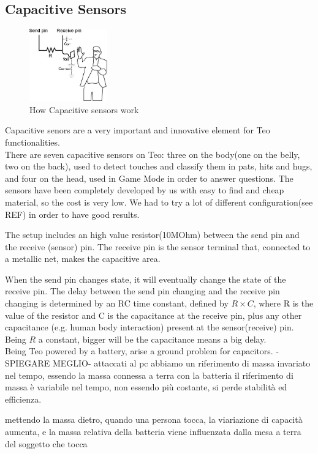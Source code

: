 \subsection{Capacitive Sensors}
\begin{figure}[h]
	\centering
	\includegraphics[width=0.3\textwidth]{CapSense}
	\caption{How Capacitive sensors work}
\end{figure}
Capacitive senors are a very important and innovative element for Teo functionalities.\\
There are seven capacitive sensors on Teo: three on the body(one on the belly, two on the back), used to detect touches and classify them in pats, hits and hugs, and four on the head, used in Game Mode in order to answer questions. 
The sensors have been completely developed by us with easy to find and cheap material, so the cost is very low. We had to try a lot of different configuration(see REF) in order to have good results. 

The setup includes an high value resistor(10MOhm) between the send pin and the receive (sensor) pin. The receive pin is the sensor terminal that, connected to a metallic net, makes the capacitive area.

When the send pin changes state, it will eventually change the state of the receive pin. The delay between the send pin changing and the receive pin changing is determined by an RC time constant, defined by $R \times C$, where R is the value of the resistor and C is the capacitance at the receive pin, plus any other capacitance (e.g. human body interaction) present at the sensor(receive) pin\cite{CapSenseLib}. Being $R$ a constant, bigger will be the capacitance means a big delay.\\

Being Teo powered by a battery, arise a ground problem for capacitors. 
-SPIEGARE MEGLIO-
attaccati al pc abbiamo un riferimento di massa invariato nel tempo, essendo la massa connessa a terra
con la batteria il riferimento di massa è variabile nel tempo, non essendo più costante, si perde stabilità ed efficienza.

mettendo la massa dietro, quando una persona tocca, la viariazione di capacità aumenta, e la massa relativa della batteria viene influenzata dalla mesa a terra del soggetto che tocca

